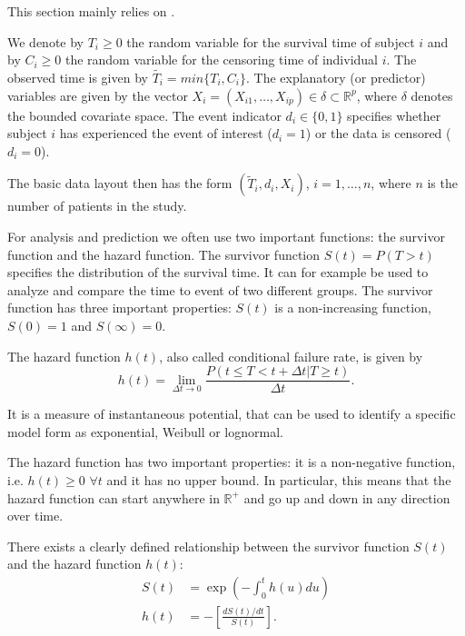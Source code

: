\documentclass[12pt, a4paper]{article}
\theoremstyle{definition}
\theoremstyle{plain}
\numberwithin{equation}{section}
\numberwithin{figure}{section}
\numberwithin{table}{section}
\begin{document}
	This section mainly relies on \citet*{sabook}.
	
	
	We denote by $T_i \geq 0$ the random variable for the survival time of subject $i$ and by $C_i \geq 0$ the random variable for the censoring time of individual $i$.
	The observed time is given by $\tilde{T_i} = min\{T_i,C_i\}$.
	The explanatory (or predictor) variables are given by the vector $X_i = (X_{i1}, \dots , X_{ip}) \in \delta \subset \mathbb{R}^p$, where $\delta$ denotes the bounded covariate space.
	The event indicator $d_i \in \{0,1\}$ specifies whether subject $i$ has experienced the event of interest ($d_i=1$) or the data is censored ($d_i=0$).
	
	The basic data layout then has the form $(\tilde{T}_i, d_i, X_i)$, $i = 1, \dots , n$, where $n$ is the number of patients in the study.
	
	
	For analysis and prediction we often use two important functions: the survivor function and the hazard function.
	The survivor function $S(t) = P(T > t)$ specifies the distribution of the survival time.
	It can for example be used to analyze and compare the time to event of two different groups.
	The survivor function has three important properties: $S(t)$ is a non-increasing function, $S(0)=1$ and $S(\infty)=0$.

	
	The hazard function $h(t)$, also called conditional failure rate, is given by
	\begin{equation*}
		h(t) = \lim_{\Delta t \to 0}\frac{P(t \leq T < t + \Delta t \vert T \geq t)}{\Delta t}.
	\end{equation*} 
	
	It is a measure of instantaneous potential, that can be used to identify a specific model form as exponential, Weibull or lognormal.
	
	
	The hazard function has two important properties: it is a non-negative function, i.e. $h(t) \geq 0$ $ \forall t$ and it has no upper bound.
	In particular, this means that the hazard function can start anywhere in $\mathbb{R}^+$ and go up and down in any direction over time.

	There exists a clearly defined relationship between the survivor function $S(t)$ and the hazard function $h(t)$:
	\begin{equation*}
	\begin{split}
		S(t) &= \exp \left( - \int_{0}^{t}h(u)du\right) \\
		h(t) & = - \left[ \frac{dS(t)/dt}{S(t)}\right].
	\end{split}
	\end{equation*}
\end{document}
